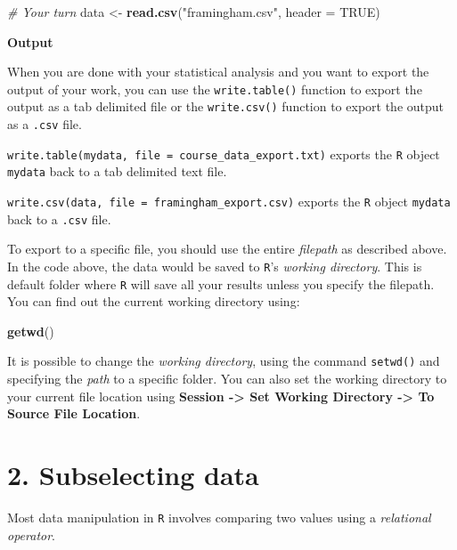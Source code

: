 \documentclass[
]{article}
\newenvironment{Shaded}{\begin{snugshade}}{\end{snugshade}}
\newcommand{\CommentTok}[1]{\textcolor[rgb]{0.56,0.35,0.01}{\textit{#1}}}
\newcommand{\DataTypeTok}[1]{\textcolor[rgb]{0.13,0.29,0.53}{#1}}
\newcommand{\KeywordTok}[1]{\textcolor[rgb]{0.13,0.29,0.53}{\textbf{#1}}}
\newcommand{\NormalTok}[1]{#1}
\newcommand{\OtherTok}[1]{\textcolor[rgb]{0.56,0.35,0.01}{#1}}
\newcommand{\StringTok}[1]{\textcolor[rgb]{0.31,0.60,0.02}{#1}}
\begin{document}
\begin{Shaded}
\begin{Highlighting}[]
\CommentTok{# Your turn}
\NormalTok{data <-}\StringTok{ }\KeywordTok{read.csv}\NormalTok{(}\StringTok{"framingham.csv"}\NormalTok{, }\DataTypeTok{header =} \OtherTok{TRUE}\NormalTok{)}
\end{Highlighting}
\end{Shaded}

\textbf{Output}

When you are done with your statistical analysis and you want to export
the output of your work, you can use the \texttt{write.table()} function
to export the output as a tab delimited file or the \texttt{write.csv()}
function to export the output as a \texttt{.csv} file.

\texttt{write.table(mydata,\ file\ =\ \textquotesingle{}course\_data\_export.txt\textquotesingle{})}
exports the \texttt{R} object \texttt{mydata} back to a tab delimited
text file.

\texttt{write.csv(data,\ file\ =\ \textquotesingle{}framingham\_export.csv\textquotesingle{})}
exports the \texttt{R} object \texttt{mydata} back to a \texttt{.csv}
file.

To export to a specific file, you should use the entire \emph{filepath}
as described above. In the code above, the data would be saved to
\texttt{R}'s \emph{working directory}. This is default folder where
\texttt{R} will save all your results unless you specify the filepath.
You can find out the current working directory using:

\begin{Shaded}
\begin{Highlighting}[]
\KeywordTok{getwd}\NormalTok{()}
\end{Highlighting}
\end{Shaded}

It is possible to change the \emph{working directory}, using the command
\texttt{setwd()} and specifying the \emph{path} to a specific folder.
You can also set the working directory to your current file location
using \textbf{Session -\textgreater{} Set Working Directory
-\textgreater{} To Source File Location}.

\hypertarget{subselecting-data}{%
\section{2. Subselecting data}\label{subselecting-data}}

Most data manipulation in \texttt{R} involves comparing two values using
a \emph{relational operator}.
\end{document}
